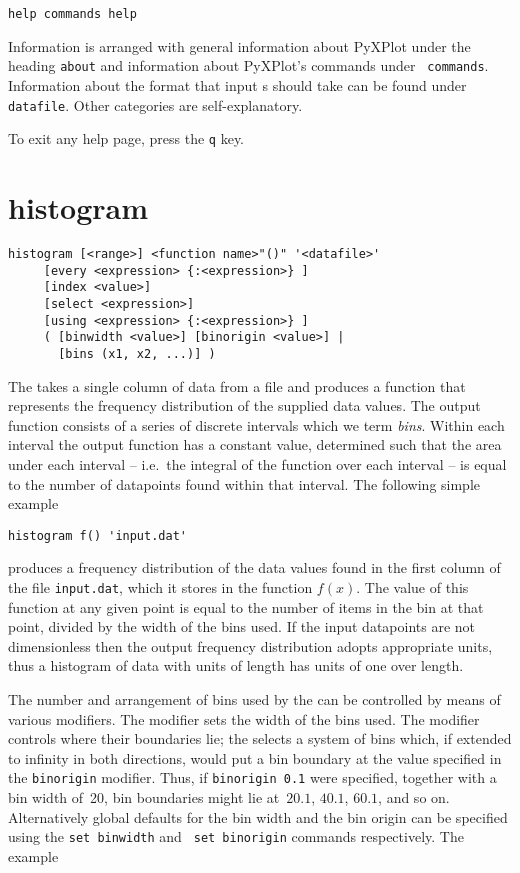 \begin{verbatim}
help commands help
\end{verbatim}

Information is arranged with general information about PyXPlot under the
heading {\tt about} and information about PyXPlot's commands under {\tt
commands}.  Information about the format that input \datafile s should take can
be found under {\tt datafile}.  Other categories are self-explanatory.

To exit any help page, press the {\tt q} key.


\section{histogram}

\begin{verbatim}
histogram [<range>] <function name>"()" '<datafile>'
     [every <expression> {:<expression>} ]
     [index <value>]
     [select <expression>]
     [using <expression> {:<expression>} ]
     ( [binwidth <value>] [binorigin <value>] |
       [bins (x1, x2, ...)] )
\end{verbatim}

The  takes a single column of data from a file and produces
a function that represents the frequency distribution of the supplied data
values. The output function consists of a series of discrete intervals which we
term {\it bins}. Within each interval the output function has a constant value,
determined such that the area under each interval -- i.e.\ the integral of the
function over each interval -- is equal to the number of datapoints found
within that interval.  The following simple example

\begin{verbatim}
histogram f() 'input.dat'
\end{verbatim}

\noindent produces a frequency distribution of the data values found in the
first column of the file {\tt input.dat}, which it stores in the function
$f(x)$. The value of this function at any given point is equal to the number of
items in the bin at that point, divided by the width of the bins used. If the
input datapoints are not dimensionless then the output frequency distribution
adopts appropriate units, thus a histogram of data with units of length has
units of one over length.

The number and arrangement of bins used by the  can be
controlled by means of various modifiers.  The  modifier sets
the width of the bins used. The  modifier controls where
their boundaries lie; the  selects a system of bins which,
if extended to infinity in both directions, would put a bin boundary at the
value specified in the {\tt binorigin} modifier. Thus, if {\tt binorigin 0.1}
were specified, together with a bin width of~20, bin boundaries might lie
at~$20.1$, $40.1$, $60.1$, and so on. Alternatively global defaults for the bin
width and the bin origin can be specified using the {\tt set binwidth} and {\tt
set binorigin} commands respectively. The example

